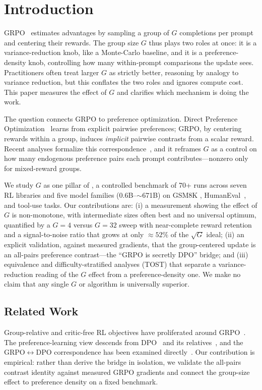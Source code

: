 \section{Introduction}
\label{sec:p3-intro}
GRPO~\citep{shao2024deepseekmath, guo2025deepseekr1} estimates advantages by
sampling a group of $G$ completions per prompt and centering their rewards. The
group size $G$ thus plays two roles at once: it is a variance-reduction knob, like
a Monte-Carlo baseline, and it is a preference-density knob, controlling how many
within-prompt comparisons the update sees. Practitioners often treat larger $G$ as
strictly better, reasoning by analogy to variance reduction, but this conflates the
two roles and ignores compute cost. This paper measures the effect of $G$ and
clarifies which mechanism is doing the work.

The question connects GRPO to preference optimization. Direct Preference
Optimization~\citep{rafailov2024direct} learns from explicit pairwise preferences;
GRPO, by centering rewards within a group, induces \emph{implicit} pairwise
contrasts from a scalar reward. Recent analyses formalize this
correspondence~\citep{wu2025grpo_dpo, liu2026gdpo}, and it reframes $G$ as a control
on how many endogenous preference pairs each prompt contributes---nonzero only for
mixed-reward groups.

We study $G$ as one pillar of \ours{}, a controlled benchmark of 70+ runs across
seven RL libraries and five model families ($0.6$B--$\sim$671B) on GSM8K
\citep{cobbe2021training}, HumanEval~\citep{chen2021codex}, and tool-use tasks. Our
contributions are: (i) a measurement showing the effect of $G$ is non-monotone,
with intermediate sizes often best and no universal optimum, quantified by a
$G{=}4$ versus $G{=}32$ sweep with near-complete reward retention and a
signal-to-noise ratio that grows at only $\approx 52\%$ of the $\sqrt{G}$ ideal;
(ii) an explicit validation, against measured gradients, that the group-centered
update is an all-pairs preference contrast---the ``GRPO is secretly DPO'' bridge;
and (iii) equivalence and difficulty-stratified analyses (TOST) that separate a
variance-reduction reading of the $G$ effect from a preference-density one. We make
no claim that any single $G$ or algorithm is universally superior.

\subsection{Related Work}
\label{sec:p3-related}
Group-relative and critic-free RL objectives have proliferated around
GRPO~\citep{shao2024deepseekmath, ahmadian2024backtobasics, lin2025cppo, gift2025}.
The preference-learning view descends from
DPO~\citep{rafailov2024direct} and its relatives~\citep{azar2024ipo, ethayarajh2024kto, hong2024orpo}, and the GRPO$\leftrightarrow$DPO correspondence has been examined
directly~\citep{wu2025grpo_dpo, liu2026gdpo}. Our contribution is empirical: rather
than derive the bridge in isolation, we validate the all-pairs contrast identity
against measured GRPO gradients and connect the group-size effect to preference
density on a fixed benchmark.
